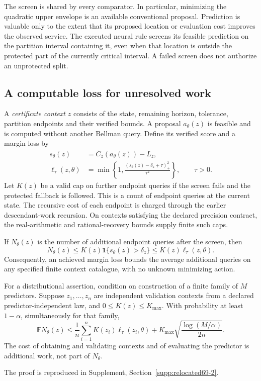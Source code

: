 The screen is shared by every comparator. In particular, minimizing the quadratic upper envelope is an available conventional proposal. Prediction is valuable only to the extent that its proposed location or evaluation cost improves the observed service. The executed neural rule screens its feasible prediction on the partition interval containing it, even when that location is outside the protected part of the currently critical interval. A failed screen does not authorize an unprotected split.

\subsection{A computable loss for unresolved work}
A \emph{certificate context} $z$ consists of the state, remaining horizon, tolerance, partition endpoints and their verified bounds. A proposal $a_\theta(z)$ is feasible and is computed without another Bellman query. Define its verified score and a margin loss by
\begin{align}
 s_\theta(z)&=\overline C_z(a_\theta(z))-L_z,\label{eq:score67}\\
 \ell_\tau(z,\theta)&=\min\left\{1,
       \frac{(s_\theta(z)-\delta_z+\tau)_+^2}{\tau^2}\right\},
       \qquad \tau>0.\label{eq:work-loss67}
\end{align}
Let $K(z)$ be a valid cap on further endpoint queries if the screen fails and the protected fallback is followed. This is a count of endpoint queries at the current state. The recursive cost of each endpoint is charged through the earlier descendant-work recursion. On contexts satisfying the declared precision contract, the real-arithmetic and rational-recovery bounds supply finite such caps.

\begin{theorem}\label{thm:work-loss67}
If $N_\theta(z)$ is the number of additional endpoint queries after the screen, then
\begin{equation}\label{eq:work-bound67}
 N_\theta(z)\le K(z)\mathbf1\{s_\theta(z)>\delta_z\}
                    \le K(z)\ell_\tau(z,\theta).
\end{equation}
Consequently, an achieved margin loss bounds the average additional queries on any specified finite context catalogue, with no unknown minimizing action.

For a distributional assertion, condition on construction of a finite family of $M$ predictors. Suppose $z_1,\ldots,z_n$ are independent validation contexts from a declared predictor-independent law, and $0\le K(z)\le K_{\max}$. With probability at least $1-\alpha$, simultaneously for that family,
\begin{equation}\label{eq:work-validation67}
 \mathbb E N_\theta(z)\le
 \frac1n\sum_{i=1}^n K(z_i)\ell_\tau(z_i,\theta)
 +K_{\max}\sqrt{\frac{\log(M/\alpha)}{2n}}.
\end{equation}
The cost of obtaining and validating contexts and of evaluating the predictor is additional work, not part of $N_\theta$.
\end{theorem}
\noindent The proof is reproduced in Supplement, Section~\ref{supp:relocated69-2}.

